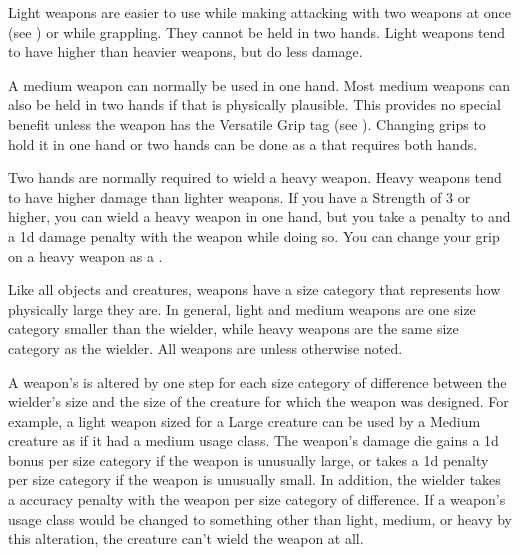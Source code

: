 

        \label{Light Weapons} Light weapons are easier to use while making attacking with two weapons at once (see ) or while grappling.
        They cannot be held in two hands.
        Light weapons tend to have higher  than heavier weapons, but do less damage.

         A medium weapon can normally be used in one hand.
        Most medium weapons can also be held in two hands if that is physically plausible.
        This provides no special benefit unless the weapon has the Versatile Grip tag (see ).
        Changing grips to hold it in one hand or two hands can be done as a  that requires both hands.

         Two hands are normally required to wield a heavy weapon.
        Heavy weapons tend to have higher damage than lighter weapons.
        If you have a Strength of 3 or higher, you can wield a heavy weapon in one hand, but you take a  penalty to  and a \minus1d damage penalty with the weapon while doing so.
        You can change your grip on a heavy weapon as a .

         Like all objects and creatures, weapons have a size category that represents how physically large they are. In general, light and medium weapons are one size category smaller than the wielder, while heavy weapons are the same size category as the wielder.
        All weapons are  unless otherwise noted.

        \label{Inappropriately Sized Weapons} A weapon's  is altered by one step for each size category of difference between the wielder's size and the size of the creature for which the weapon was designed.
        For example, a light weapon sized for a Large creature can be used by a Medium creature as if it had a medium usage class.
        The weapon's damage die gains a \plus1d bonus per size category if the weapon is unusually large, or takes a \minus1d penalty per size category if the weapon is unusually small.
        In addition, the wielder takes a  accuracy penalty with the weapon per size category of difference.
        If a weapon's usage class would be changed to something other than light, medium, or heavy by this alteration, the creature can't wield the weapon at all.

